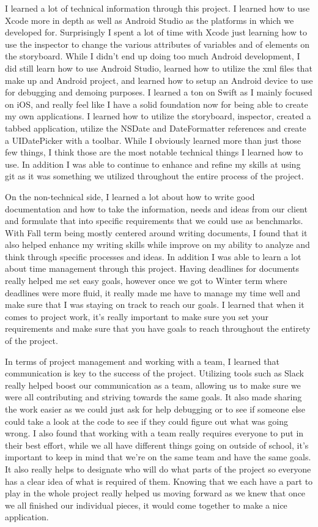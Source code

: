 \documentclass[letterpaper,10pt,draftclsnofoot,onecolumn,titlepage]{IEEEtran}
\begin{document}
		I learned a lot of technical information through this project.
		I learned how to use Xcode more in depth as well as Android Studio as the platforms in which we developed for.
		Surprisingly I spent a lot of time with Xcode just learning how to use the inspector to change the various attributes of variables and of elements on the storyboard.
		While I didn't end up doing too much Android development, I did still learn how to use Android Studio, learned how to utilize the xml files that make up and Android project, and learned how to setup an Android device to use for debugging and demoing purposes.
		I learned a ton on Swift as I mainly focused on iOS, and really feel like I have a solid foundation now for being able to create my own applications.
		I learned how to utilize the storyboard, inspector, created a tabbed application, utilize the NSDate and DateFormatter references and create a UIDatePicker with a toolbar.
		While I obviously learned more than just those few things, I think those are the most notable technical things I learned how to use.
		In addition I was able to continue to enhance and refine my skills at using git as it was something we utilized throughout the entire process of the project.

		On the non-technical side, I learned a lot about how to write good documentation and how to take the information, needs and ideas from our client and formulate that into specific requirements that we could use as benchmarks.
		With Fall term being mostly centered around writing documents, I found that it also helped enhance my writing skills while improve on my ability to analyze and think through specific processes and ideas.
		In addition I was able to learn a lot about time management through this project.
		Having deadlines for documents really helped me set easy goals, however once we got to Winter term where deadlines were more fluid, it really made me have to manage my time well and make sure that I was staying on track to reach our goals.
		I learned that when it comes to project work, it's really important to make sure you set your requirements and make sure that you have goals to reach throughout the entirety of the project.

		In terms of project management and working with a team, I learned that communication is key to the success of the project.
		Utilizing tools such as Slack really helped boost our communication as a team, allowing us to make sure we were all contributing and striving towards the same goals.
		It also made sharing the work easier as we could just ask for help debugging or to see if someone else could take a look at the code to see if they could figure out what was going wrong.
		I also found that working with a team really requires everyone to put in their best effort, while we all have different things going on outside of school, it's important to keep in mind that we're on the same team and have the same goals.
		It also really helps to designate who will do what parts of the project so everyone has a clear idea of what is required of them.
		Knowing that we each have a part to play in the whole project really helped us moving forward as we knew that once we all finished our individual pieces, it would come together to make a nice application.
\end{document}
